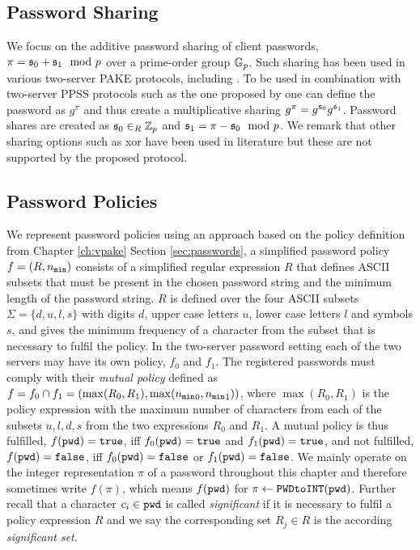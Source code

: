 \subsection{Password Sharing}
We focus on the additive password sharing of client passwords, \ie $\pi=\mathfrak{s}_0+\mathfrak{s}_1 \mod p$ over a prime-order group $\mathbb{G}_p$.
Such sharing has been used in various two-server \ac{PAKE} protocols, including \cite{Katz2012a,Yang_Deng_Bao_2006,Jin_Wong_Xu_2007}.
To be used in combination with two-server \ac{PPSS} protocols such as the one proposed by \citet{Camenisch2012} one can define the password as $g^\pi$ and thus create a multiplicative sharing $g^\pi=g^{\mathfrak{s}_0}g^{\mathfrak{s}_1}$.
Password shares are created as $\mathfrak{s}_0\in_R\mathbb{Z}_p$ and $\mathfrak{s}_1=\pi-\mathfrak{s}_0 \mod p$.
We remark that other sharing options such as xor \cite{BrainardJKS03,SzydloK05} have been used in literature but these are not supported by the proposed protocol.


\subsection{Password Policies}
We represent password policies using an approach based on the policy definition from Chapter \ref{ch:vpake} Section \ref{sec:passwords}, \ie a simplified password policy $f=(R,{n_\mathtt{min}})$ consists of a simplified regular expression $R$ that defines \ac{ASCII} subsets that must be present in the chosen password string and the minimum length \pmin of the password string.
$R$ is defined over the four \ac{ASCII} subsets $\Sigma=\{d,u,l,s\}$ with digits $d$, upper case letters $u$, lower case letters $l$ and symbols $s$, and gives the minimum frequency of a character from the subset that is necessary to fulfil the policy.
In the two-server password setting each of the two servers may have its own policy, \ie $f_0$ and $f_1$.
The registered passwords must comply with their \emph{mutual policy} defined as $f=f_0\cap f_1=(\max(R_0,R_1),\max({n_\mathtt{min}}_0,{n_\mathtt{min}}_1))$, where $\max(R_0,R_1)$ is the policy expression with the maximum number of characters from each of the subsets $u,l,d,s$ from the two expressions $R_0$ and $R_1$.
A mutual policy is thus fulfilled, \ie $f(\mathtt{pwd})=\mathtt{true}$, iff $f_0(\mathtt{pwd})=\mathtt{true}$ and $f_1(\mathtt{pwd})=\mathtt{true}$, and not fulfilled, \ie $f(\mathtt{pwd})=\mathtt{false}$, iff $f_0(\mathtt{pwd})=\mathtt{false}$ or $f_1(\mathtt{pwd})=\mathtt{false}$.
We mainly operate on the integer representation $\pi$ of a password \pwd throughout this chapter and therefore sometimes write $f(\pi)$, which means $f(\mathtt{pwd})$ for $\pi\gets\texttt{PWDtoINT}(\mathtt{pwd})$.
Further recall that a character $c_i\in\mathtt{pwd}$ is called \emph{significant} if it is necessary to fulfil a policy expression $R$ and we say the corresponding set $R_j\in R$ is the according \emph{significant set}.
